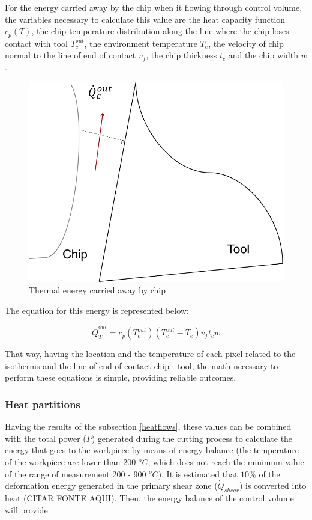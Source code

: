 	For the energy carried away by the chip when it flowing through control volume, the variables necessary to calculate this value are the heat capacity function $c_{p}(T)$, the chip temperature distribution along the line where the chip loses contact with tool $T_{c}^{out}$, the environment temperature $T_{e}$, the velocity of chip normal to the line of end of contact $v_{f}$, the chip thickness $t_{c}$ and the chip width $w$.

	\begin{figure}[H]
		\centering
		\captionsetup{justification=centering}
		\includegraphics[scale=0.75]{Cap4/energyChip.png}
		\caption{Thermal energy carried away by chip}
		\label{fig:energychip}
	\end{figure}

	The equation for this energy is represented below:

	\begin{equation} 
	\label{eq_energychip}
		\dot{Q}_{T}^{out} = c_{p}(T_{c}^{out})(T_{c}^{out} - T_{e})v_{f}t_{c}w
	\end{equation}

	That way, having the location and the temperature of each pixel related to the isotherms and the line of end of contact chip - tool, the math necessary to perform these equations is simple, providing reliable outcomes.

		\subsubsection{Heat partitions}
		Having the results of the subsection \ref{heatflows}, these values can be combined with the total power ($P$) generated during the cutting process to calculate the energy that goes to the workpiece by means of energy balance (the temperature of the workpiece are lower than 200 $^{o}C$, which does not reach the minimum value of the range of measurement 200 - 900 $^{o}C$).
		It is estimated that $10\%$ of the deformation energy generated in the primary shear zone ($\dot{Q}_{shear}$) is converted into heat (CITAR FONTE AQUI). Then, the energy balance of the control volume will provide:

